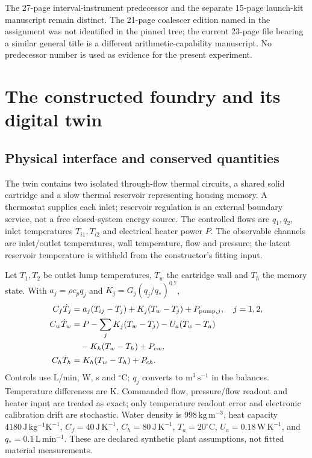 \documentclass[11pt,letterpaper]{article}
\begin{document}
The 27-page interval-instrument predecessor \cite{intervalpredecessor} and the separate 15-page launch-kit manuscript \cite{launchkitpredecessor} remain distinct. The 21-page coalescer edition named in the assignment was not identified in the pinned tree; the current 23-page file bearing a similar general title is a different arithmetic-capability manuscript. No predecessor number is used as evidence for the present experiment.

\section{The constructed foundry and its digital twin}
\label{sec:world}
\subsection{Physical interface and conserved quantities}
The twin contains two isolated through-flow thermal circuits, a shared solid cartridge and a slow thermal reservoir representing housing memory. A thermostat supplies each inlet; reservoir regulation is an external boundary service, not a free closed-system energy source. The controlled flows are $q_1,q_2$, inlet temperatures $T_{i1},T_{i2}$ and electrical heater power $P$. The observable channels are inlet/outlet temperatures, wall temperature, flow and pressure; the latent reservoir temperature is withheld from the constructor's fitting input.

Let $T_1,T_2$ be outlet lump temperatures, $T_w$ the cartridge wall and $T_h$ the memory state. With $a_j=\rho c_pq_j$ and $K_j=G_j(q_j/q_*)^{0.7}$,
\begin{align}
C_f\dot T_j &= a_j(T_{ij}-T_j)+K_j(T_w-T_j)+P_{\mathrm{pump},j},\quad j=1,2,\\
C_w\dot T_w &=P-\sum_jK_j(T_w-T_j)-U_a(T_w-T_a)\notag\\
&\quad-K_h(T_w-T_h)+P_{cw},\\
C_h\dot T_h &=K_h(T_w-T_h)+P_{ch}.
\label{eq:thermal}
\end{align}
Controls use L/min, W, s and $^{\circ}$C; $q_j$ converts to $\mathrm{m^3\,s^{-1}}$ in the balances. Temperature differences are K. Commanded flow, pressure/flow readout and heater input are treated as exact; only temperature readout error and electronic calibration drift are stochastic. Water density is $998\,\mathrm{kg\,m^{-3}}$, heat capacity $4180\,\mathrm{J\,kg^{-1}K^{-1}}$, $C_f=40\,\mathrm{J\,K^{-1}}$, $C_h=80\,\mathrm{J\,K^{-1}}$, $T_a=20^{\circ}\mathrm C$, $U_a=0.18\,\mathrm{W\,K^{-1}}$, and $q_*=0.1\,\mathrm{L\,min^{-1}}$. These are declared synthetic plant assumptions, not fitted material measurements.
\end{document}
